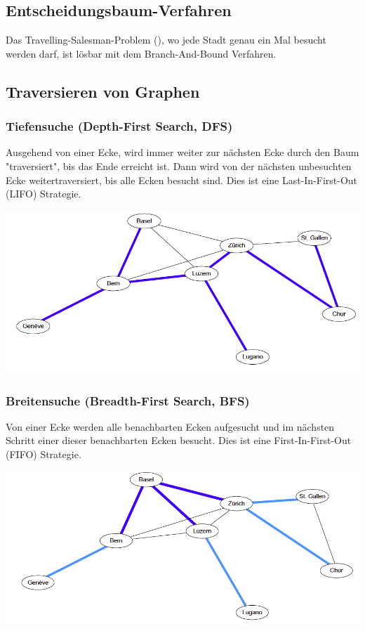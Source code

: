 \subsection{Entscheidungsbaum-Verfahren }
	Das Travelling-Salesman-Problem (), wo jede Stadt genau ein Mal besucht werden darf, ist lösbar mit dem Branch-And-Bound Verfahren.


\subsection{Traversieren von Graphen }

\begin{minipage}{0.5\textwidth}
	\subsubsection{Tiefensuche (Depth-First Search, DFS)}
		Ausgehend von einer Ecke, wird immer weiter zur nächsten Ecke durch den Baum "traversiert", bis das Ende erreicht ist. Dann wird von der nächsten unbesuchten Ecke weitertraversiert, bis alle Ecken besucht sind. Dies ist eine Last-In-First-Out (LIFO) Strategie.
		
		\includegraphics[width=\textwidth]{Content/Graphen/DFS.png}  
\end{minipage}
\begin{minipage}{0.5\textwidth}
	\subsubsection{Breitensuche (Breadth-First Search, BFS)}
	  	Von einer Ecke werden alle benachbarten Ecken aufgesucht und im nächsten Schritt einer dieser benachbarten Ecken besucht. Dies ist eine First-In-First-Out (FIFO) Strategie.
	  	
	  	\includegraphics[width=\textwidth]{Content/Graphen/BFS.png}  
\end{minipage}


